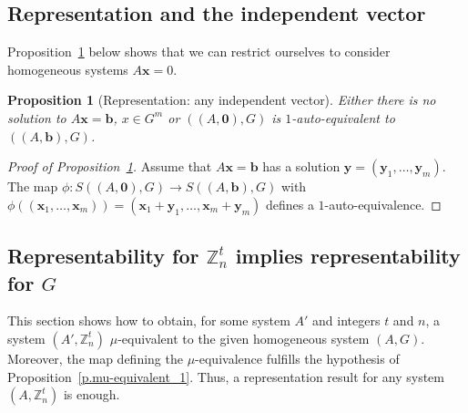 \documentclass[10pt]{article}
\newtheorem{proposition}[theorem]{Proposition}
\newcommand{\Z}{\mathbb Z}
\begin{document}

\subsection{Representation and the independent vector} \label{s.rep_indep_vector}

Proposition~\ref{p.hom_to_all} below shows that we can restrict ourselves to consider homogeneous systems $A\mathbf{x}=0$.

\begin{proposition}[Representation: any independent vector] \label{p.hom_to_all}
Either there is no solution to $A\mathbf{x}=\mathbf{b}$, $x\in G^m$ or
 $((A,\mathbf{0}),G)$ is $1$-auto-equivalent to $((A,\mathbf{b}),G)$. \end{proposition}

\begin{proof}[Proof of Proposition~\ref{p.hom_to_all}]
	Assume that $A\mathbf{x}=\mathbf{b}$ has a solution $\mathbf{y}=(\mathbf{y}_1,\ldots,\mathbf{y}_m)$. The map $\phi: S((A,\mathbf{0}),G) \to S((A,\mathbf{b}),G)$ with $\phi((\mathbf{x}_1,\ldots,\mathbf{x}_m))=(\mathbf{x}_1+\mathbf{y}_1,\ldots,\mathbf{x}_m+\mathbf{y}_m)$ 
defines a $1$-auto-equivalence.
\end{proof}





\subsection{Representability for $\Z_n^t$ implies representability for $G$}
\label{s.repr_for_Zt_implies_G}

This section shows how to obtain, for some system $A'$ and integers $t$ and $n$, a system $(A',\Z_n^t)$ $\mu$-equivalent to the given homogeneous system $(A,G)$. Moreover, the map defining the $\mu$-equivalence fulfills the hypothesis of Proposition~\ref{p.mu-equivalent_1}. 
Thus, a representation result for any system $(A,\Z_n^t)$ is enough.
\end{document}
